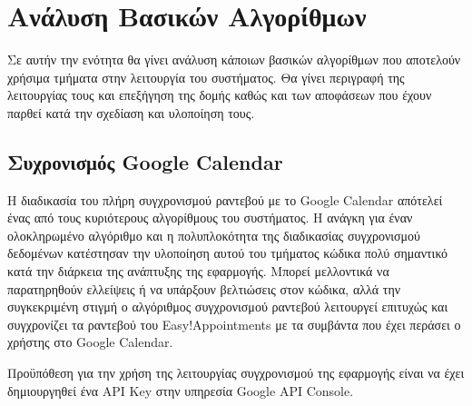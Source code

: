 \section{Ανάλυση Βασικών Αλγορίθμων}
Σε αυτήν την ενότητα θα γίνει ανάλυση κάποιων βασικών αλγορίθμων που αποτελούν χρήσιμα τμήματα στην λειτουργία του συστήματος. Θα γίνει περιγραφή της λειτουργίας τους και επεξήγηση της δομής καθώς και των αποφάσεων που έχουν παρθεί κατά την σχεδίαση και υλοποίηση τους.

\subsection{Συχρονισμός Google Calendar}
Η διαδικασία του πλήρη συγχρονισμού ραντεβού με το Google Calendar απότελεί ένας από τους κυριότερους αλγορίθμους του συστήματος. Η ανάγκη για έναν ολοκληρωμένο αλγόριθμο και η πολυπλοκότητα της διαδικασίας συγχρονισμού δεδομένων κατέστησαν την υλοποίηση αυτού του τμήματος κώδικα πολύ σημαντικό κατά την διάρκεια της ανάπτυξης της εφαρμογής. Μπορεί μελλοντικά να παρατηρηθούν ελλείψεις ή να υπάρξουν βελτιώσεις στον κώδικα, αλλά την συγκεκριμένη στιγμή ο αλγόριθμος συγχρονισμού ραντεβού λειτουργεί επιτυχώς και συγχρονίζει τα ραντεβού του Easy!Appointments με τα συμβάντα που έχει περάσει ο χρήστης στο Google Calendar.

Προϋπόθεση για την χρήση της λειτουργίας συγχρονισμού της εφαρμογής είναι να έχει δημιουργηθεί ένα API Key στην υπηρεσία Google API Console. 

